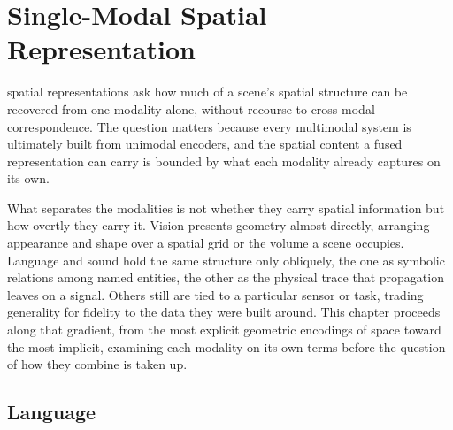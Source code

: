 \chapter{Single-Modal Spatial Representation}
\label{chapter:single_modality}


 spatial representations ask how much of a scene's spatial structure can be recovered from one modality alone, without recourse to cross-modal correspondence.
The question matters because every multimodal system is ultimately built from unimodal encoders, and the spatial content a fused representation can carry is bounded by what each modality already captures on its own.

What separates the modalities is not whether they carry spatial information but how overtly they carry it.
Vision presents geometry almost directly, arranging appearance and shape over a spatial grid or the volume a scene occupies.
Language and sound hold the same structure only obliquely, the one as symbolic relations among named entities, the other as the physical trace that propagation leaves on a signal.
Others still are tied to a particular sensor or task, trading generality for fidelity to the data they were built around.
This chapter proceeds along that gradient, from the most explicit geometric encodings of space toward the most implicit, examining each modality on its own terms before the question of how they combine is taken up.










































\section{Language}
\label{sec:rep_language}

